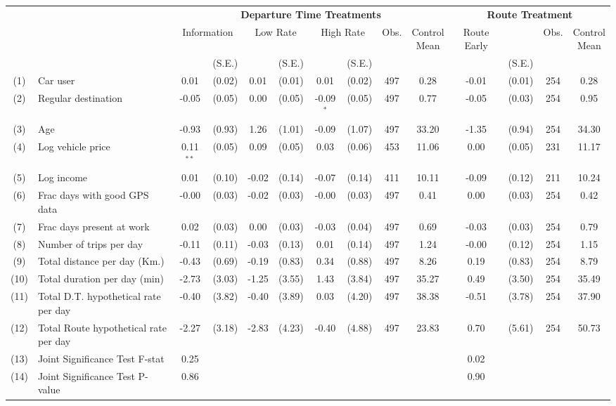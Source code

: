 \begin{tabular}{clcccccccccccc}
\toprule
 & & \multicolumn{8}{c}{\textbf{Departure Time Treatments}} & \multicolumn{4}{c}{\textbf{Route Treatment}} \\
\addlinespace
 & & \multicolumn{2}{c}{Information} &  \multicolumn{2}{c}{Low Rate} &  \multicolumn{2}{c}{High Rate} &  Obs. & \thead{Control \\ Mean} &  Route Early & & Obs. & \thead{Control \\ Mean} \\
\addlinespace
 & & & (S.E.) & & (S.E.) & & (S.E.) & & & & (S.E.) \\
\addlinespace\addlinespace
 (1) & Car user & 0.01 & (0.02) &  0.01 & (0.01) & 0.01 & (0.02) &  497 & 0.28 &  -0.01 & (0.01) &  254 & 0.28 \\
\addlinespace
 (2) & Regular destination & -0.05 & (0.05) &  0.00 & (0.05) & -0.09$^{*}$ & (0.05) &  497 & 0.77 &  -0.05 & (0.03) &  254 & 0.95 \\
\addlinespace
 (3) & Age & -0.93 & (0.93) &  1.26 & (1.01) & -0.09 & (1.07) &  497 & 33.20 &  -1.35 & (0.94) &  254 & 34.30 \\
\addlinespace
 (4) & Log vehicle price & 0.11$^{**}$ & (0.05) &  0.09 & (0.05) & 0.03 & (0.06) &  453 & 11.06 &  0.00 & (0.05) &  231 & 11.17 \\
\addlinespace
 (5) & Log income & 0.01 & (0.10) &  -0.02 & (0.14) & -0.07 & (0.14) &  411 & 10.11 &  -0.09 & (0.12) &  211 & 10.24 \\
\addlinespace
 (6) & Frac days with good GPS data & -0.00 & (0.03) &  -0.02 & (0.03) & -0.00 & (0.03) &  497 & 0.41 &  0.00 & (0.03) &  254 & 0.42 \\
\addlinespace
 (7) & Frac days present at work & 0.02 & (0.03) &  0.00 & (0.03) & -0.03 & (0.04) &  497 & 0.69 &  -0.03 & (0.03) &  254 & 0.79 \\
\addlinespace
 (8) & Number of trips per day & -0.11 & (0.11) &  -0.03 & (0.13) & 0.01 & (0.14) &  497 & 1.24 &  -0.00 & (0.12) &  254 & 1.15 \\
\addlinespace
 (9) & Total distance per day (Km.) & -0.43 & (0.69) &  -0.19 & (0.83) & 0.34 & (0.88) &  497 & 8.26 &  0.19 & (0.83) &  254 & 8.79 \\
\addlinespace
 (10) & Total duration per day (min) & -2.73 & (3.03) &  -1.25 & (3.55) & 1.43 & (3.84) &  497 & 35.27 &  0.49 & (3.50) &  254 & 35.49 \\
\addlinespace
 (11) & Total D.T. hypothetical rate per day & -0.40 & (3.82) &  -0.40 & (3.89) & 0.03 & (4.20) &  497 & 38.38 &  -0.51 & (3.78) &  254 & 37.90 \\
\addlinespace
 (12) & Total Route hypothetical rate per day  & -2.27 & (3.18) &  -2.83 & (4.23) & -0.40 & (4.88) &  497 & 23.83 &  0.70 & (5.61) &  254 & 50.73 \\
\addlinespace
\addlinespace\addlinespace
(13) & Joint Significance Test F-stat &  0.25 & & & & & & & & 0.02 \\
(14) & Joint Significance Test P-value &  0.86 & & & & & & & & 0.90 \\ 
\bottomrule
\end{tabular}
